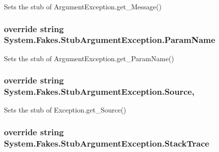 Sets the stub of Argument\-Exception.\-get\-\_\-\-Message()

\hypertarget{class_system_1_1_fakes_1_1_stub_argument_exception_ac8d395e69b20b840e72fe2812fbb633b}{
\subsubsection[{Param\-Name}]{\setlength{\rightskip}{0pt plus 5cm}override string System.\-Fakes.\-Stub\-Argument\-Exception.\-Param\-Name\hspace{0.3cm}{\ttfamily [get]}}}\label{class_system_1_1_fakes_1_1_stub_argument_exception_ac8d395e69b20b840e72fe2812fbb633b}


Sets the stub of Argument\-Exception.\-get\-\_\-\-Param\-Name()

\hypertarget{class_system_1_1_fakes_1_1_stub_argument_exception_ae79c03360e607d0f871f5ba078dd5a18}{
\subsubsection[{Source}]{\setlength{\rightskip}{0pt plus 5cm}override string System.\-Fakes.\-Stub\-Argument\-Exception.\-Source\hspace{0.3cm}{\ttfamily [get]}, {\ttfamily [set]}}}\label{class_system_1_1_fakes_1_1_stub_argument_exception_ae79c03360e607d0f871f5ba078dd5a18}


Sets the stub of Exception.\-get\-\_\-\-Source()

\hypertarget{class_system_1_1_fakes_1_1_stub_argument_exception_a2c7c3ccb0d0baed391ccd5b3b8e0a03a}{
\subsubsection[{Stack\-Trace}]{\setlength{\rightskip}{0pt plus 5cm}override string System.\-Fakes.\-Stub\-Argument\-Exception.\-Stack\-Trace\hspace{0.3cm}{\ttfamily [get]}}}\label{class_system_1_1_fakes_1_1_stub_argument_exception_a2c7c3ccb0d0baed391ccd5b3b8e0a03a}


